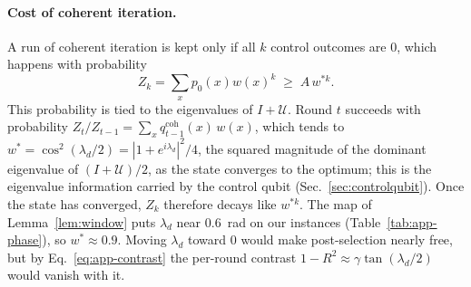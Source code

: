 \paragraph{Cost of coherent iteration.} A run of coherent iteration is kept only if all $k$ control outcomes are $0$, which happens with probability
\begin{equation}
Z_k=\sum_xp_0(x)w(x)^k\;\ge\;A\,w^{*k}.
\label{eq:app-survival}
\end{equation}
This probability is tied to the eigenvalues of $I+\mathcal{U}$. Round $t$ succeeds with probability $Z_t/Z_{t-1}=\sum_xq^{\mathrm{coh}}_{t-1}(x)\,w(x)$, which tends to $w^*=\cos^2(\lambda_d/2)=|1+e^{i\lambda_d}|^2/4$, the squared magnitude of the dominant eigenvalue of $(I+\mathcal{U})/2$, as the state converges to the optimum; this is the eigenvalue information carried by the control qubit (Sec.~\ref{sec:controlqubit}). Once the state has converged, $Z_k$ therefore decays like $w^{*k}$. The map of Lemma~\ref{lem:window} puts $\lambda_d$ near $0.6$~rad on our instances (Table~\ref{tab:app-phase}), so $w^*\approx0.9$. Moving $\lambda_d$ toward $0$ would make post-selection nearly free, but by Eq.~\eqref{eq:app-contrast} the per-round contrast $1-R^2\approx\gamma\tan(\lambda_d/2)$ would vanish with it.

